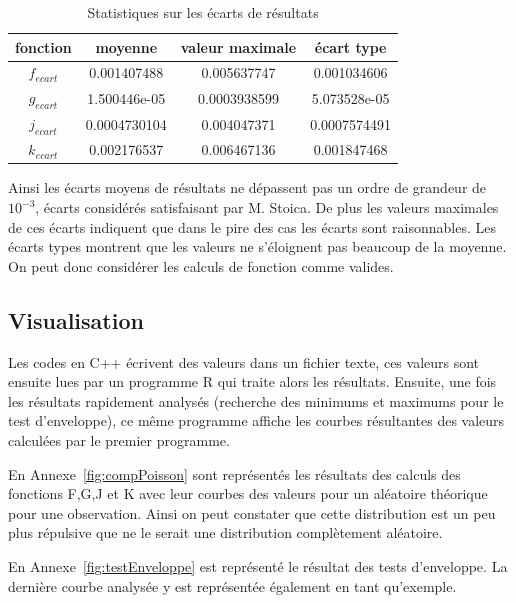 \documentclass[stage2a]{tnreport}
\begin{document}
\begin{table}[ht]
    \centering
    \begin{tabular}{|c|c|c|c|}
          \hline
          fonction & moyenne & valeur maximale & écart type \\
          \hline
          $f_{ecart}$ & 0.001407488 & 0.005637747 & 0.001034606 \\
          \hline
          $g_{ecart}$ & 1.500446e-05 & 0.0003938599 & 5.073528e-05 \\
          \hline
          $j_{ecart}$ & 0.0004730104 & 0.004047371 & 0.0007574491 \\
          \hline
          $k_{ecart}$ & 0.002176537 & 0.006467136 & 0.001847468\\
          \hline
    \end{tabular}
    \caption{Statistiques sur les écarts de résultats}
    \label{tab:stats}
\end{table}
Ainsi les écarts moyens de résultats ne dépassent pas un ordre de grandeur de $10^{-3}$, écarts considérés satisfaisant par M. Stoica. De plus les valeurs maximales de ces écarts indiquent que dans le pire des cas les écarts sont raisonnables. Les écarts types montrent que les valeurs ne s'éloignent pas beaucoup de la moyenne. On peut donc considérer les calculs de fonction comme valides.


\subsection{Visualisation}

Les codes en C++ écrivent des valeurs dans un fichier texte, ces valeurs sont ensuite lues par un programme R qui traite alors les résultats. Ensuite, une fois les résultats rapidement analysés (recherche des minimums et maximums pour le test d'enveloppe), ce même programme affiche les courbes résultantes des valeurs calculées par le premier programme.

En Annexe~\ref{fig:compPoisson} sont représentés les résultats des calculs des fonctions F,G,J et K avec leur courbes des valeurs pour un aléatoire théorique pour une observation. Ainsi on peut constater que cette distribution est un peu plus répulsive que ne le serait une distribution complètement aléatoire.

En Annexe~\ref{fig:testEnveloppe} est représenté le résultat des tests d'enveloppe. La dernière courbe analysée y est représentée également en tant qu'exemple.
\end{document}
